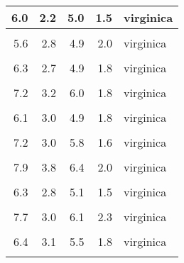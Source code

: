 \documentclass[
]{article}
\begin{document}
\begin{table}
\begin{tabular}[t]{r|r|r|r|l}
\hline
6.0 & 2.2 & 5.0 & 1.5 & virginica\\
\hline
\cellcolor{gray!6}{6.9} & \cellcolor{gray!6}{3.2} & \cellcolor{gray!6}{5.7} & \cellcolor{gray!6}{2.3} & \cellcolor{gray!6}{virginica}\\
\hline
5.6 & 2.8 & 4.9 & 2.0 & virginica\\
\hline
\cellcolor{gray!6}{7.7} & \cellcolor{gray!6}{2.8} & \cellcolor{gray!6}{6.7} & \cellcolor{gray!6}{2.0} & \cellcolor{gray!6}{virginica}\\
\hline
6.3 & 2.7 & 4.9 & 1.8 & virginica\\
\hline
\cellcolor{gray!6}{6.7} & \cellcolor{gray!6}{3.3} & \cellcolor{gray!6}{5.7} & \cellcolor{gray!6}{2.1} & \cellcolor{gray!6}{virginica}\\
\hline
7.2 & 3.2 & 6.0 & 1.8 & virginica\\
\hline
\cellcolor{gray!6}{6.2} & \cellcolor{gray!6}{2.8} & \cellcolor{gray!6}{4.8} & \cellcolor{gray!6}{1.8} & \cellcolor{gray!6}{virginica}\\
\hline
6.1 & 3.0 & 4.9 & 1.8 & virginica\\
\hline
\cellcolor{gray!6}{6.4} & \cellcolor{gray!6}{2.8} & \cellcolor{gray!6}{5.6} & \cellcolor{gray!6}{2.1} & \cellcolor{gray!6}{virginica}\\
\hline
7.2 & 3.0 & 5.8 & 1.6 & virginica\\
\hline
\cellcolor{gray!6}{7.4} & \cellcolor{gray!6}{2.8} & \cellcolor{gray!6}{6.1} & \cellcolor{gray!6}{1.9} & \cellcolor{gray!6}{virginica}\\
\hline
7.9 & 3.8 & 6.4 & 2.0 & virginica\\
\hline
\cellcolor{gray!6}{6.4} & \cellcolor{gray!6}{2.8} & \cellcolor{gray!6}{5.6} & \cellcolor{gray!6}{2.2} & \cellcolor{gray!6}{virginica}\\
\hline
6.3 & 2.8 & 5.1 & 1.5 & virginica\\
\hline
\cellcolor{gray!6}{6.1} & \cellcolor{gray!6}{2.6} & \cellcolor{gray!6}{5.6} & \cellcolor{gray!6}{1.4} & \cellcolor{gray!6}{virginica}\\
\hline
7.7 & 3.0 & 6.1 & 2.3 & virginica\\
\hline
\cellcolor{gray!6}{6.3} & \cellcolor{gray!6}{3.4} & \cellcolor{gray!6}{5.6} & \cellcolor{gray!6}{2.4} & \cellcolor{gray!6}{virginica}\\
\hline
6.4 & 3.1 & 5.5 & 1.8 & virginica\\
\hline
\cellcolor{gray!6}{6.0} & \cellcolor{gray!6}{3.0} & \cellcolor{gray!6}{4.8} & \cellcolor{gray!6}{1.8} & \cellcolor{gray!6}{virginica}\\

\end{tabular}
\end{table}
\end{document}
